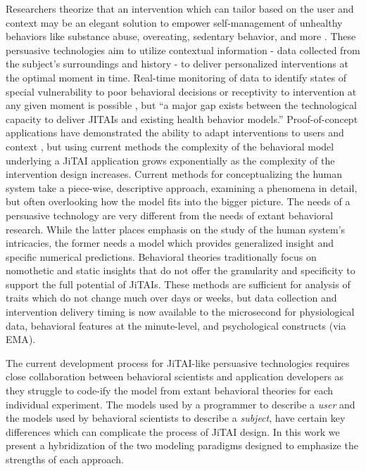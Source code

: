 \documentclass[runningheads,a4paper]{llncs}
\begin{document}
Researchers theorize that an intervention which can tailor based on the user and context may be an elegant solution to empower self-management of unhealthy behaviors like substance abuse, overeating, sedentary behavior, and more \cite{nahum2014}.
These persuasive technologies aim to utilize contextual information - data collected from the subject's surroundings and history - to deliver personalized interventions at the optimal moment in time.
Real-time monitoring of data to identify states of special vulnerability to poor behavioral decisions or receptivity to intervention at any given moment is possible \cite{hekler2013realizing}, but ``a major gap exists between the technological capacity to deliver JITAIs and existing health behavior models.'' \cite{nahum2014}
Proof-of-concept applications have demonstrated the ability to adapt interventions to users \cite{dallery2014optimizing} \cite{beck2010challenges} and context \cite{brailsford2010towards} \cite{collins2004conceptual}, but using current methods the complexity of the behavioral model underlying a JiTAI application grows exponentially as the complexity of the intervention design increases. 
Current methods for conceptualizing the human system take a piece-wise, descriptive approach, examining a phenomena in detail, but often overlooking how the model fits into the bigger picture.
The needs of a persuasive technology are very different from the needs of extant behavioral research.
While the latter places emphasis on the study of the human system's intricacies, the former needs a model which provides generalized insight and specific numerical predictions.
Behavioral theories traditionally focus on nomothetic and static insights that do not offer the granularity and specificity to support the full potential of JiTAIs\cite{riley2011healthbehavior}.
These methods are sufficient for analysis of traits which do not change much over days or weeks, but data collection and intervention delivery timing is now available to the microsecond for physiological data, behavioral features at the minute-level, and psychological constructs (via EMA\cite{shiffman2008ecological}).

The current development process for JiTAI-like persuasive technologies requires close collaboration between behavioral scientists and application developers as they struggle to code-ify the model from extant behavioral theories for each individual experiment.
The models used by a programmer to describe a \emph{user} and the models used by behavioral scientists to describe a \emph{subject}, have certain key differences which can complicate the process of JiTAI design.
In this work we present a hybridization of the two modeling paradigms designed to emphasize the strengths of each approach.
\end{document}
